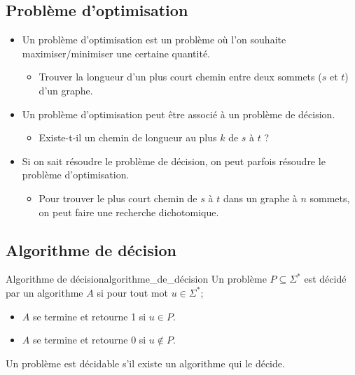 \subsection{Problème d'optimisation}
\label{sub:probleme_d_optimisation}
\begin{itemize}[label=\textbullet]
    \item Un problème d'optimisation est un problème où l'on souhaite maximiser/minimiser une certaine quantité.
    \begin{itemize}[label=$\rightarrow$]
        \item Trouver la longueur d'un plus court chemin entre deux sommets ($s$ et $t$) d'un graphe.
    \end{itemize}
    \item Un problème d'optimisation peut être associé à un problème de décision.
    \begin{itemize}[label=$\rightarrow$]
        \item Existe-t-il un chemin de longueur au plus $k$ de $s$ à $t$ ?
    \end{itemize}
    \item Si on sait résoudre le problème de décision, on peut parfois résoudre le problème d'optimisation.
    \begin{itemize}[label=$\rightarrow$]
        \item Pour trouver le plus court chemin de $s$ à $t$ dans un graphe à $n$ sommets, on peut faire une recherche
        dichotomique.
    \end{itemize}
\end{itemize}

\subsection{Algorithme de décision}
\label{sub:algorithme_de_decision}
\begin{definition}{Algorithme de décision}{algorithme_de_décision}
    Un problème $P\subseteq\Sigma^*$ est décidé par un algorithme $A$ si pour tout mot $u\in\Sigma^*$;
    \begin{itemize}[label=\textbullet]
        \item $A$ se termine et retourne 1 si $u\in P$.
        \item $A$ se termine et retourne 0 si $u\notin P$.
    \end{itemize}
    Un problème est décidable s'il existe un algorithme qui le décide.
\end{definition}

